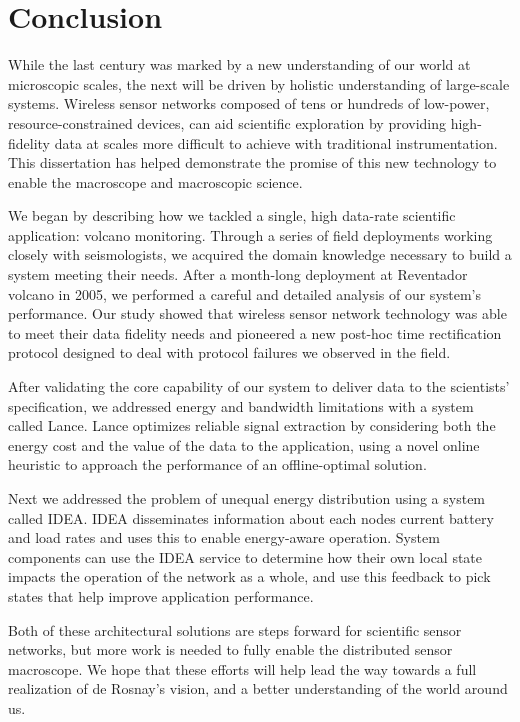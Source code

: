 \chapter{Conclusion}
\label{chapter-conclusion}

While the last century was marked by a new understanding of our world at
microscopic scales, the next will be driven by holistic understanding of
large-scale systems. Wireless sensor networks composed of tens or hundreds
of low-power, resource-constrained devices, can aid scientific exploration by
providing high-fidelity data at scales more difficult to achieve with
traditional instrumentation. This dissertation has helped demonstrate the
promise of this new technology to enable the macroscope and macroscopic
science.

We began by describing how we tackled a single, high data-rate scientific
application: volcano monitoring. Through a series of field deployments
working closely with seismologists, we acquired the domain knowledge
necessary to build a system meeting their needs. After a month-long
deployment at Reventador volcano in 2005, we performed a careful and detailed
analysis of our system's performance. Our study showed that wireless sensor
network technology was able to meet their data fidelity needs and pioneered a
new post-hoc time rectification protocol designed to deal with protocol
failures we observed in the field.

After validating the core capability of our system to deliver data to the
scientists' specification, we addressed energy and bandwidth limitations with
a system called Lance. Lance optimizes reliable signal extraction by
considering both the energy cost and the value of the data to the
application, using a novel online heuristic to approach the performance of an
offline-optimal solution.

Next we addressed the problem of unequal energy distribution using a system
called IDEA. IDEA disseminates information about each nodes current battery
and load rates and uses this to enable energy-aware operation. System
components can use the IDEA service to determine how their own local state
impacts the operation of the network as a whole, and use this feedback to
pick states that help improve application performance.

Both of these architectural solutions are steps forward for scientific sensor
networks, but more work is needed to fully enable the distributed sensor
macroscope. We hope that these efforts will help lead the way towards a full
realization of de Rosnay's vision, and a better understanding of the world
around us.

